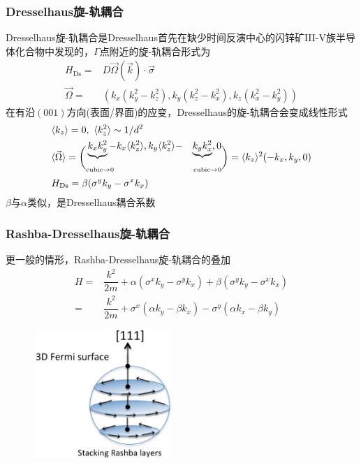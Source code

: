 {\frame
{
	\frametitle{\textrm{Dresselhaus}旋-轨耦合}
	\textrm{Dresselhaus}旋-轨耦合是\textrm{Dresselhaus}首先在缺少时间反演中心的闪锌矿\textrm{III-V}族半导体化合物中发现的，$\Gamma$点附近的旋-轨耦合形式为
	\begin{displaymath}
		\begin{aligned}
			H_{\mathrm{Ds}}=&D\vec{\Omega}(\vec k)\cdot\vec{\sigma}\\
			\vec{\Omega}=&(k_x(k_y^2-k_z^2),k_y(k_z^2-k_x^2),k_z(k_x^2-k_y^2))
		\end{aligned}
	\end{displaymath}
	在有沿$(001)$方向(表面/界面)的应变，\textrm{Dresselhaus}的旋-轨耦合会变成线性形式
	\begin{displaymath}
		\begin{aligned}
			&\langle k_z\rangle=0,~\langle k_z^2\rangle\sim1/d^2\\
			&\langle\vec\Omega\rangle=\bigg(
				\begin{aligned}
				&\underbrace{k_xk_y^2}-k_x\langle k_z^2\rangle,k_y\langle k_z^2\rangle-&\underbrace{k_yk_x^2},0\\
				&{\mbox{\fontsize{6.2pt}{2.2pt}\selectfont{\textrm{cubic}$\rightarrow$0}}} &{\mbox{\fontsize{6.2pt}{2.2pt}\selectfont{\textrm{cubic}$\rightarrow$0}}}
			\end{aligned}
			\bigg)
				=\langle k_z\rangle^2(-k_x,k_y,0)\\
			&H_{\mathrm{Ds}}=\beta(\sigma^yk_y-\sigma^xk_x)
		\end{aligned}
	\end{displaymath}
$\beta$与$\alpha$类似，是\textrm{Dresselhaus}耦合系数 
}

\frame
{
	\frametitle{\textrm{Rashba-Dresselhaus}旋-轨耦合}
	更一般的情形，\textrm{Rashba-Dresselhaus}旋-轨耦合的叠加
	\begin{displaymath}
		\begin{aligned}
			H=&\dfrac{k^2}{2m}+\alpha(\sigma^xk_y-\sigma^yk_x)+\beta(\sigma^yk_y-\sigma^xk_x)\\
			=&\dfrac{k^2}{2m}+\sigma^x(\alpha k_y-\beta k_x)-\sigma^y(\alpha k_x-\beta k_y)
		\end{aligned}
	\end{displaymath}
\begin{figure}[h!]
\centering
\vspace*{-0.10in}
\includegraphics[height=1.9in,width=2.10in,viewport=0 0 850 810,clip]{Figures/SOC_Rashba-Dresselhaus-1.png}
\label{Rashba_Dresselhaus}
\end{figure}
}

}
